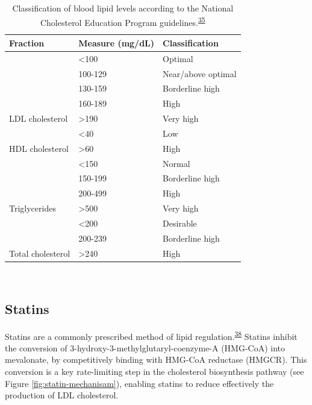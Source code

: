 \documentclass[a4paper, twoside]{templates/ociamthesis}
\begin{document}
\begin{table}[H]

\caption[Classification of blood lipid levels]{\label{tab:lipidLevels-table}Classification of blood lipid levels according to the National Cholesterol Education Program guidelines.\textsuperscript{\protect\hyperlink{ref-national2002third}{35}}}
\centering
\begin{tabular}[t]{lll}
\toprule
\textbf{Fraction} & \textbf{Measure (mg/dL)} & \textbf{Classification}\\
\midrule
 & <100 & Optimal\\
\cmidrule{2-3}
 & 100-129 & Near/above optimal\\
\cmidrule{2-3}
 & 130-159 & Borderline high\\
\cmidrule{2-3}
 & 160-189 & High\\
\cmidrule{2-3}
\multirow{-5}{*}{\raggedright\arraybackslash LDL cholesterol} & >190 & Very high\\
\cmidrule{1-3}
 & <40 & Low\\
\cmidrule{2-3}
\multirow{-2}{*}{\raggedright\arraybackslash HDL cholesterol} & >60 & High\\
\cmidrule{1-3}
 & <150 & Normal\\
\cmidrule{2-3}
 & 150-199 & Borderline high\\
\cmidrule{2-3}
 & 200-499 & High\\
\cmidrule{2-3}
\multirow{-4}{*}{\raggedright\arraybackslash Triglycerides} & >500 & Very high\\
\cmidrule{1-3}
 & <200 & Desirable\\
\cmidrule{2-3}
 & 200-239 & Borderline high\\
\cmidrule{2-3}
\multirow{-3}{*}{\raggedright\arraybackslash Total cholesterol} & >240 & High\\
\bottomrule
\end{tabular}
\end{table}

~

\hypertarget{intro-statins}{%
\subsection{Statins}\label{intro-statins}}

Statins are a commonly prescribed method of lipid regulation.\textsuperscript{\protect\hyperlink{ref-collins2016}{38}} Statins inhibit the conversion of 3-hydroxy-3-methylglutaryl-coenzyme-A (HMG-CoA) into mevalonate, by competitively binding with HMG-CoA reductase (HMGCR). This conversion is a key rate-limiting step in the cholesterol biosynthesis pathway (see Figure \ref{fig:statin-mechanisam}), enabling statins to reduce effectively the production of LDL cholesterol.
\end{document}
